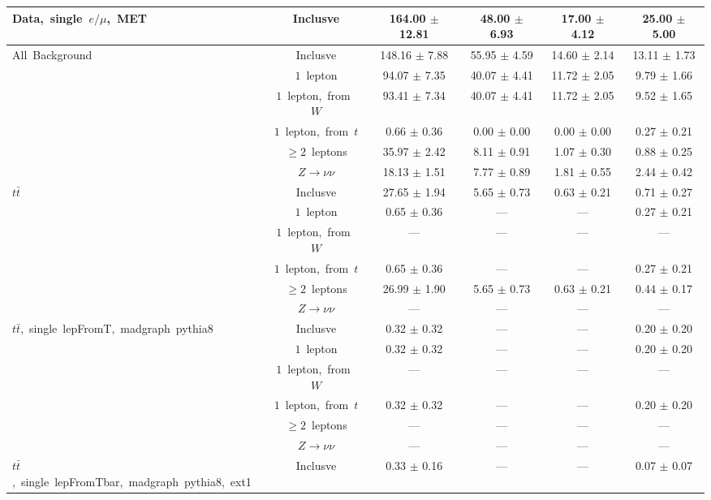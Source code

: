 \documentclass{article}
\begin{document}
\begin{longtable}{|l|c|c|c|c|c|}
\multirow{1}{*}{Data,~single~$e/\mu$,~MET} & Inclusve  & 164.00 $\pm$ 12.81  & 48.00 $\pm$ 6.93  & 17.00 $\pm$ 4.12  & 25.00 $\pm$ 5.00 \\* 
\hline \hline 
\multirow{6}{*}{All~Background} & Inclusve  & 148.16 $\pm$ 7.88  & 55.95 $\pm$ 4.59  & 14.60 $\pm$ 2.14  & 13.11 $\pm$ 1.73 \\* 
 & $1$~lepton  & 94.07 $\pm$ 7.35  & 40.07 $\pm$ 4.41  & 11.72 $\pm$ 2.05  & 9.79 $\pm$ 1.66 \\* 
 & $1$~lepton,~from~$W$  & 93.41 $\pm$ 7.34  & 40.07 $\pm$ 4.41  & 11.72 $\pm$ 2.05  & 9.52 $\pm$ 1.65 \\* 
 & $1$~lepton,~from~$t$  & 0.66 $\pm$ 0.36  & 0.00 $\pm$ 0.00  & 0.00 $\pm$ 0.00  & 0.27 $\pm$ 0.21 \\* 
 & $\ge2$~leptons  & 35.97 $\pm$ 2.42  & 8.11 $\pm$ 0.91  & 1.07 $\pm$ 0.30  & 0.88 $\pm$ 0.25 \\* 
 & $Z\rightarrow\nu\nu$  & 18.13 $\pm$ 1.51  & 7.77 $\pm$ 0.89  & 1.81 $\pm$ 0.55  & 2.44 $\pm$ 0.42 \\* 
\hline 
\multirow{6}{*}{$t\bar{t}$} & Inclusve  & 27.65 $\pm$ 1.94  & 5.65 $\pm$ 0.73  & 0.63 $\pm$ 0.21  & 0.71 $\pm$ 0.27 \\* 
 & $1$~lepton  & 0.65 $\pm$ 0.36  & ---  & ---  & 0.27 $\pm$ 0.21 \\* 
 & $1$~lepton,~from~$W$  & ---  & ---  & ---  & --- \\* 
 & $1$~lepton,~from~$t$  & 0.65 $\pm$ 0.36  & ---  & ---  & 0.27 $\pm$ 0.21 \\* 
 & $\ge2$~leptons  & 26.99 $\pm$ 1.90  & 5.65 $\pm$ 0.73  & 0.63 $\pm$ 0.21  & 0.44 $\pm$ 0.17 \\* 
 & $Z\rightarrow\nu\nu$  & ---  & ---  & ---  & --- \\* 
\hline 
\multirow{6}{*}{$t\bar{t}$,~single~lepFromT,~madgraph~pythia8} & Inclusve  & 0.32 $\pm$ 0.32  & ---  & ---  & 0.20 $\pm$ 0.20 \\* 
 & $1$~lepton  & 0.32 $\pm$ 0.32  & ---  & ---  & 0.20 $\pm$ 0.20 \\* 
 & $1$~lepton,~from~$W$  & ---  & ---  & ---  & --- \\* 
 & $1$~lepton,~from~$t$  & 0.32 $\pm$ 0.32  & ---  & ---  & 0.20 $\pm$ 0.20 \\* 
 & $\ge2$~leptons  & ---  & ---  & ---  & --- \\* 
 & $Z\rightarrow\nu\nu$  & ---  & ---  & ---  & --- \\* 
\hline 
\multirow{6}{*}{$t\bar{t}$,~single~lepFromTbar,~madgraph~pythia8,~ext1} & Inclusve  & 0.33 $\pm$ 0.16  & ---  & ---  & 0.07 $\pm$ 0.07 \\* 

\end{longtable}
\end{document}
